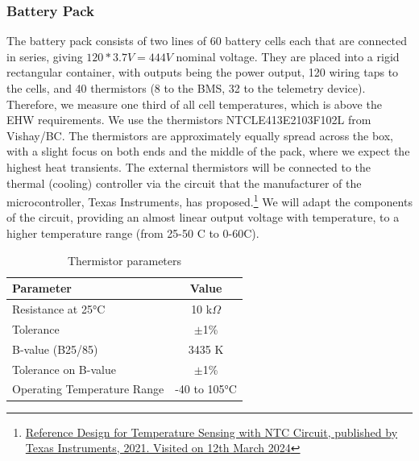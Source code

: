\subsubsection*{Battery Pack}
The battery pack consists of two lines of 60 battery cells each that are connected in series, giving \(120 * 3.7 V = 444 V \) nominal voltage. They are placed into a rigid rectangular container, with outputs being the power output, 120 wiring taps to the cells, and 40 thermistors (8 to the BMS, 32 to the telemetry device). \\
Therefore, we measure one third of all cell temperatures, which is above the EHW requirements.
We use the thermistors NTCLE413E2103F102L from Vishay/BC.
The thermistors are approximately equally spread across the box, with a slight focus on both ends and the middle of the pack, where we expect the highest heat transients.
The external thermistors will be connected to the thermal (cooling) controller via the circuit that the manufacturer of the microcontroller, Texas Instruments, has proposed.\footnote{\href{https://www.ti.com/lit/an/sboa323a/sboa323a.pdf}{Reference Design for Temperature Sensing with NTC Circuit, published by Texas Instruments, 2021. Visited on 12th March 2024}} We will adapt the components of the circuit, providing an almost linear output voltage with temperature, to a higher temperature range (from 25-50 C to 0-60C).
\begin{table}[ht]
    \centering
    \caption{Thermistor parameters}
    \label{thermistor1-parameters}
    \begin{tabular}{|l|c|}
        \toprule
        Parameter & Value \\
        \midrule
        Resistance at 25°C & 10 k$\Omega$ \\
        Tolerance & $\pm$1\% \\
        B-value (B25/85) & 3435 K \\
        Tolerance on B-value & $\pm$1\% \\
        Operating Temperature Range & -40 to 105°C \\
        \bottomrule
    \end{tabular}
\end{table}

